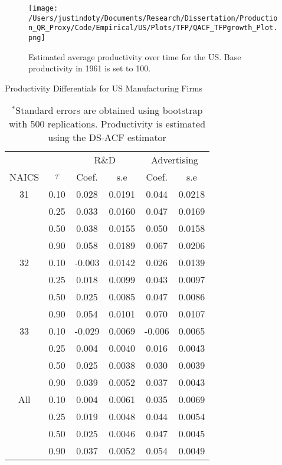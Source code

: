 \documentclass[11pt]{article}
\begin{document}
\begin{figure}[H]
\centering
\texttt{[image: /Users/justindoty/Documents/Research/Dissertation/Production\_QR\_Proxy/Code/Empirical/US/Plots/TFP/QACF\_TFPgrowth\_Plot.png]}
\caption{Estimated average productivity over time for the US. Base productivity in 1961 is set to 100.}
\label{fig:USpgrowth}
\end{figure}

\begin{table}[H]
\centering
\caption{Productivity Differentials for US Manufacturing Firms}
\begin{tabular}{cccccc}
  \hline\hline & & \multicolumn{2}{c}{R\&D}  & \multicolumn{2}{c}{Advertising} \\ \cmidrule(lr){3-4} \cmidrule(lr){5-6}NAICS & $\tau$ & Coef. & s.e & Coef. & s.e \\ 
  \hline
31 & 0.10 & 0.028 & 0.0191 & 0.044 & 0.0218 \\ 
   & 0.25 & 0.033 & 0.0160 & 0.047 & 0.0169 \\ 
   & 0.50 & 0.038 & 0.0155 & 0.050 & 0.0158 \\ 
   & 0.90 & 0.058 & 0.0189 & 0.067 & 0.0206 \\ 
  32 & 0.10 & -0.003 & 0.0142 & 0.026 & 0.0139 \\ 
   & 0.25 & 0.018 & 0.0099 & 0.043 & 0.0097 \\ 
   & 0.50 & 0.025 & 0.0085 & 0.047 & 0.0086 \\ 
   & 0.90 & 0.054 & 0.0101 & 0.070 & 0.0107 \\ 
  33 & 0.10 & -0.029 & 0.0069 & -0.006 & 0.0065 \\ 
   & 0.25 & 0.004 & 0.0040 & 0.016 & 0.0043 \\ 
   & 0.50 & 0.025 & 0.0038 & 0.030 & 0.0039 \\ 
   & 0.90 & 0.039 & 0.0052 & 0.037 & 0.0043 \\ 
  All & 0.10 & 0.004 & 0.0061 & 0.035 & 0.0069 \\ 
   & 0.25 & 0.019 & 0.0048 & 0.044 & 0.0054 \\ 
   & 0.50 & 0.025 & 0.0046 & 0.047 & 0.0045 \\ 
   & 0.90 & 0.037 & 0.0052 & 0.054 & 0.0049 \\ 
   \hline
\end{tabular}
\caption*{\footnotesize $^{*}$Standard errors are obtained using bootstrap with 500 replications. Productivity is estimated using the DS-ACF estimator}
\end{table}
\end{document}
